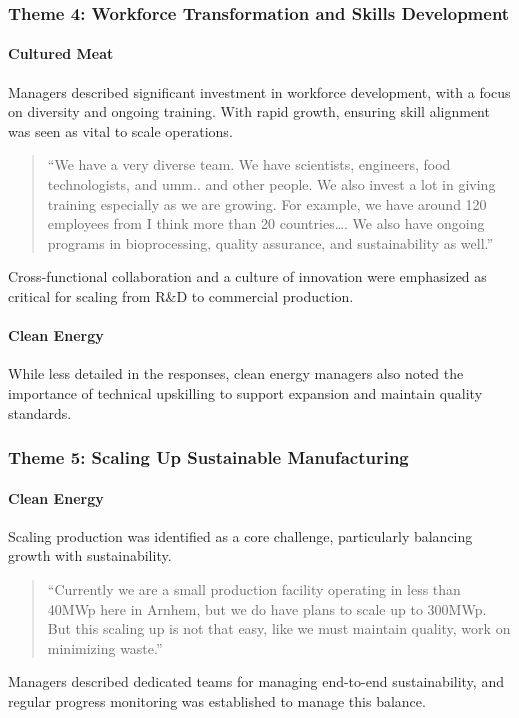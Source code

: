 \subsubsection*{Theme 4: Workforce Transformation and Skills Development}
\paragraph{Cultured Meat}
Managers described significant investment in workforce development, with a focus on diversity and ongoing training. With rapid growth, ensuring skill alignment was seen as vital to scale operations.
\begin{quote}
	“We have a very diverse team. We have scientists, engineers, food technologists, and umm.. and other people. We also invest a lot in giving training especially as we are growing. For example, we have around 120 employees from I think more than 20 countries…. We also have ongoing programs in bioprocessing, quality assurance, and sustainability as well.”
\end{quote}
Cross-functional collaboration and a culture of innovation were emphasized as critical for scaling from R\&D to commercial production.

\paragraph{Clean Energy}
While less detailed in the responses, clean energy managers also noted the importance of technical upskilling to support expansion and maintain quality standards.

\subsubsection*{Theme 5: Scaling Up Sustainable Manufacturing}
\paragraph{Clean Energy}
Scaling production was identified as a core challenge, particularly balancing growth with sustainability.
\begin{quote}
	“Currently we are a small production facility operating in less than 40MWp here in Arnhem, but we do have plans to scale up to 300MWp. But this scaling up is not that easy, like we must maintain quality, work on minimizing waste.”
\end{quote}
Managers described dedicated teams for managing end-to-end sustainability, and regular progress monitoring was established to manage this balance.

